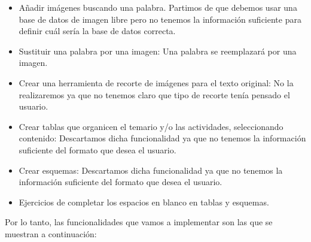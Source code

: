 \begin{itemize}
  \item Añadir imágenes buscando una palabra. Partimos de que debemos usar una base de datos de imagen libre pero no tenemos la información suficiente para definir cuál sería la base de datos correcta.
  \item Sustituir una palabra por una imagen: Una palabra se reemplazará por una imagen.
  \item Crear una herramienta de recorte de imágenes para el texto original: No la realizaremos ya que no tenemos claro que tipo de recorte tenía pensado el usuario. 
  \item Crear tablas que organicen el temario y/o las actividades, seleccionando contenido: Descartamos dicha funcionalidad ya que no tenemos la información suficiente del formato que desea el usuario.
  \item Crear esquemas: Descartamos dicha funcionalidad ya que no tenemos la información suficiente del formato que desea el usuario.
  \item Ejercicios de completar los espacios en blanco en tablas y esquemas.
\end{itemize}

Por lo tanto, las funcionalidades que vamos a implementar son las que se muestran a continuación:



